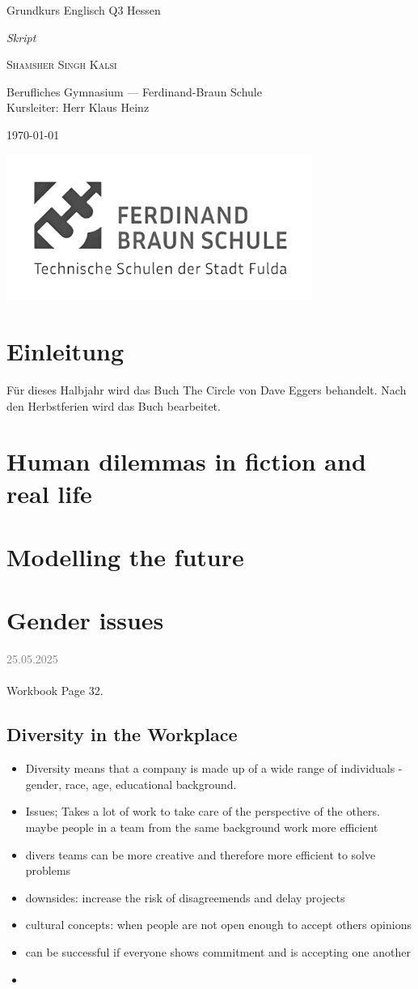 \documentclass[11pt,a4paper,oneside]{article}
\newcommand{\lessondate}[1]{
	\noindent\hfill\textcolor{gray}{\textsc{#1}} \\
	\vspace{0.5cm}
}
\newcommand{\MakeArtTitle}[4]{%
	\begin{titlepage}
		\vspace*{18mm}
		\begin{center}
			\vspace{12mm}
			{\huge\color{AccentOrange!90!black} #1 \par}
			\vspace{6mm}
			{\Large\itshape\color{AccentRed!70!black} #2 \par}
			\vspace{10mm}
			{\Large\scshape\color{AccentDark} #3 \par}
			\vspace{6mm}
			{\small\color{MarginalGray} #4 \par}
			\vspace{5mm}
			{\small\color{MarginalGray} \today \par}
		\end{center}
		\vspace{7.5cm}
		\centering
		\includegraphics[width=0.75\textwidth]{image.png} %
	\end{titlepage}
}
\begin{document}
	

	
		
	\MakeArtTitle{
		Grundkurs Englisch Q3 Hessen}
	{Skript}
	{Shamsher Singh Kalsi}
	{Berufliches Gymnasium — Ferdinand-Braun Schule \\ Kursleiter: Herr Klaus Heinz}
	
	\tableofcontents
	\bigskip
	\clearpage
	
	
	
	\section{Einleitung}
	Für dieses Halbjahr wird das Buch The Circle von Dave Eggers behandelt. Nach den Herbstferien wird das Buch bearbeitet.
	
	\section{Human dilemmas in fiction and real life}
	
	
	
	
	\section{Modelling the future}
	\section{Gender issues}
	
	\lessondate{25.05.2025}\\
	
	Workbook Page 32. 
	
	\subsection{Diversity in the Workplace}
	\begin{itemize}
		\item Diversity means that a company is made up of a wide range of individuals - gender, race, age, educational background.
		\item Issues; Takes a lot of work to take care of the perspective of the others. maybe people in a team from the same background work more efficient 
		\item divers teams can be more creative and therefore more efficient to solve problems 
		\item downsides: increase the risk of disagreemends and delay projects
		\item cultural concepts: when people are not open enough to accept others opinions
		\item can be successful if everyone shows commitment and is accepting one another
		\item 
	\end{itemize}
	
\end{document}
